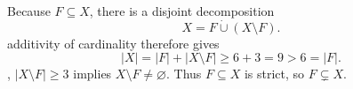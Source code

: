 Because \(F\subseteq X\), there is a disjoint decomposition\n\[X=F\mathbin{\dot\cup}(X\setminus F).\]\nFinite additivity of cardinality therefore gives\n\[|X|=|F|+|X\setminus F|\ge6+3=9>6=|F|.\]\nMoreover, \(|X\setminus F|\ge3\) implies \(X\setminus F\ne\varnothing\). Thus \(F\subseteq X\) is strict, so \(F\subsetneq X\).